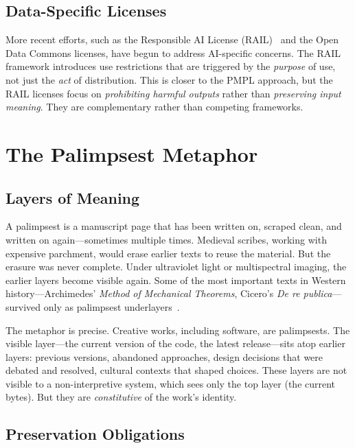 \documentclass[11pt,twocolumn]{article}
\begin{document}
\subsection{Data-Specific Licenses}

More recent efforts, such as the Responsible AI License
(RAIL)~\cite{rail2022} and the Open Data Commons licenses, have begun
to address AI-specific concerns. The RAIL framework introduces use
restrictions that are triggered by the \emph{purpose} of use, not just
the \emph{act} of distribution. This is closer to the PMPL approach,
but the RAIL licenses focus on \emph{prohibiting harmful outputs} rather
than \emph{preserving input meaning}. They are complementary rather than
competing frameworks.

\section{The Palimpsest Metaphor}
\label{sec:palimpsest}

\subsection{Layers of Meaning}

A palimpsest is a manuscript page that has been written on, scraped
clean, and written on again---sometimes multiple times. Medieval scribes,
working with expensive parchment, would erase earlier texts to reuse the
material. But the erasure was never complete. Under ultraviolet light or
multispectral imaging, the earlier layers become visible again. Some of
the most important texts in Western history---Archimedes' \emph{Method
of Mechanical Theorems}, Cicero's \emph{De re publica}---survived only
as palimpsest underlayers~\cite{netz2007archimedes}.

The metaphor is precise. Creative works, including software, are
palimpsests. The visible layer---the current version of the code, the
latest release---sits atop earlier layers: previous versions, abandoned
approaches, design decisions that were debated and resolved, cultural
contexts that shaped choices. These layers are not visible to a
non-interpretive system, which sees only the top layer (the current
bytes). But they are \emph{constitutive} of the work's identity.

\subsection{Preservation Obligations}
\end{document}
